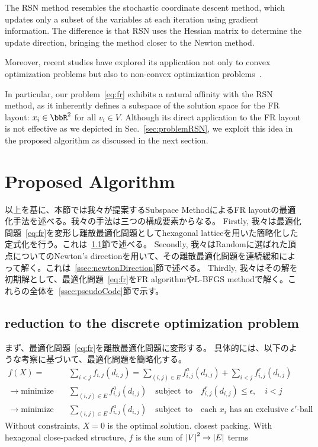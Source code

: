 \documentclass[dvipdfmx,journal]{IEEEtran}
\begin{document}
The RSN method resembles the stochastic coordinate descent method, which updates only a subset of the variables at each iteration using gradient information.
The difference is that RSN uses the Hessian matrix to determine the update direction, bringing the method closer to the Newton method.

Moreover, recent studies have explored its application not only to convex optimization problems but also to non-convex optimization problems~\cite{fujiRandomizedSubspaceRegularized2022}.

In particular, our problem~\eqref{eq:fr} exhibits a natural affinity with the RSN method, as it inherently defines a subspace of the solution space for the FR layout: $x_i \in \bbR^2$ for all $v_i \in V$.
Although its direct application to the FR layout is not effective as we depicted in Sec.~\ref{sec:problemRSN}, we exploit this idea in the proposed algorithm as discussed in the next section.

\section{Proposed Algorithm}\label{sec:algorithm}

以上を基に、本節では我々が提案するSubspace MethodによるFR layoutの最適化手法を述べる。我々の手法は三つの構成要素からなる。
Firstly, 我々は最適化問題~\eqref{eq:fr}を変形し離散最適化問題としてhexagonal latticeを用いた簡略化した定式化を行う。これは~\ref{ssec:reduction}節で述べる。
Secondly, 我々はRandomに選ばれた頂点についてのNewton's directionを用いて、その離散最適化問題を連続緩和によって解く。これは~\ref{ssec:newtonDirection}節で述べる。
Thirdly, 我々はその解を初期解として、最適化問題~\eqref{eq:fr}をFR algorithmやL-BFGS methodで解く。これらの全体を~\ref{ssec:pseudoCode}節で示す。

\subsection{reduction to the discrete optimization problem}\label{ssec:reduction}

まず、最適化問題~\eqref{eq:fr}を離散最適化問題に変形する。
具体的には、以下のような考察に基づいて、最適化問題を簡略化する。
\begin{align*}
  f(X) =                      & \sum_{i<j} f_{i,j}(d_{i,j}) = \sum_{(i,j)\in E} f^a_{i,j}(d_{i,j}) + \sum_{i<j} f^r_{i,j}(d_{i,j})                                \\
  \to \mathrm{minimize} \quad & \sum_{(i,j)\in E} f^a_{i,j}(d_{i,j}) \quad \mathrm{subject \enspace to} \quad f^r_{i,j}(d_{i,j}) \leq \epsilon, \quad i<j         \\
  \to \mathrm{minimize} \quad & \sum_{(i,j)\in E} f^a_{i,j}(d_{i,j}) \quad \mathrm{subject \enspace to} \quad \text{each $x_i$ has an exclusive $\epsilon'$-ball}
\end{align*}
Without constraints, $X=0$ is the optimal solution.
closest packing.
With hexagonal close-packed structure, $f$ is the sum of $\abs{V}^2 \to \abs{E}$ terms
\end{document}
